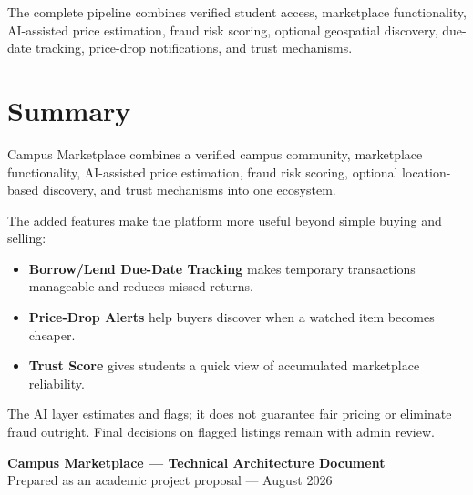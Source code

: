 \documentclass[11pt,a4paper]{article}
\begin{document}
The complete pipeline combines verified student access, marketplace functionality, AI-assisted price estimation, fraud risk scoring, optional geospatial discovery, due-date tracking, price-drop notifications, and trust mechanisms.

\section{Summary}

Campus Marketplace combines a verified campus community, marketplace functionality, AI-assisted price estimation, fraud risk scoring, optional location-based discovery, and trust mechanisms into one ecosystem.

The added features make the platform more useful beyond simple buying and selling:
\begin{itemize}
    \item \textbf{Borrow/Lend Due-Date Tracking} makes temporary transactions manageable and reduces missed returns.
    \item \textbf{Price-Drop Alerts} help buyers discover when a watched item becomes cheaper.
    \item \textbf{Trust Score} gives students a quick view of accumulated marketplace reliability.
\end{itemize}

The AI layer estimates and flags; it does not guarantee fair pricing or eliminate fraud outright. Final decisions on flagged listings remain with admin review.

\begin{center}
\textbf{Campus Marketplace --- Technical Architecture Document}\\
Prepared as an academic project proposal --- August 2026
\end{center}
\end{document}
